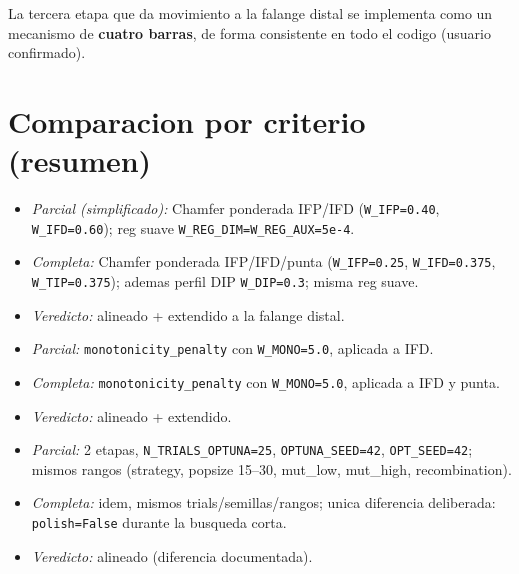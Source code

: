 \documentclass[11pt,a4paper]{article}
\newcommand{\code}[1]{\texttt{#1}}
\begin{document}
La tercera etapa que da movimiento a la falange distal se implementa como un
mecanismo de \textbf{cuatro barras}, de forma consistente en todo el codigo
(usuario confirmado).

\section{Comparacion por criterio (resumen)}

\begin{description}[leftmargin=0em,style=nextline]
  \item[(a) Funcion objetivo]\hfill
    \begin{itemize}[leftmargin=1.4em,nosep]
      \item \emph{Parcial (simplificado):} Chamfer ponderada IFP/IFD
            (\code{W\_IFP=0.40}, \code{W\_IFD=0.60}); reg suave
            \code{W\_REG\_DIM=W\_REG\_AUX=5e-4}.
      \item \emph{Completa:} Chamfer ponderada IFP/IFD/punta
            (\code{W\_IFP=0.25}, \code{W\_IFD=0.375}, \code{W\_TIP=0.375});
            ademas perfil DIP \code{W\_DIP=0.3}; misma reg suave.
      \item \emph{Veredicto:} alineado + extendido a la falange distal.
    \end{itemize}
  \item[(b) Monotonicidad]\hfill
    \begin{itemize}[leftmargin=1.4em,nosep]
      \item \emph{Parcial:} \code{monotonicity\_penalty} con \code{W\_MONO=5.0},
            aplicada a IFD.
      \item \emph{Completa:} \code{monotonicity\_penalty} con \code{W\_MONO=5.0},
            aplicada a IFD y punta.
      \item \emph{Veredicto:} alineado + extendido.
    \end{itemize}
  \item[(c) Optuna/TPE]\hfill
    \begin{itemize}[leftmargin=1.4em,nosep]
      \item \emph{Parcial:} 2 etapas, \code{N\_TRIALS\_OPTUNA=25},
            \code{OPTUNA\_SEED=42}, \code{OPT\_SEED=42}; mismos rangos (strategy,
            popsize 15--30, mut\_low, mut\_high, recombination).
      \item \emph{Completa:} idem, mismos trials/semillas/rangos; unica diferencia
            deliberada: \code{polish=False} durante la busqueda corta.
      \item \emph{Veredicto:} alineado (diferencia documentada).

\end{itemize}
\end{description}
\end{document}
